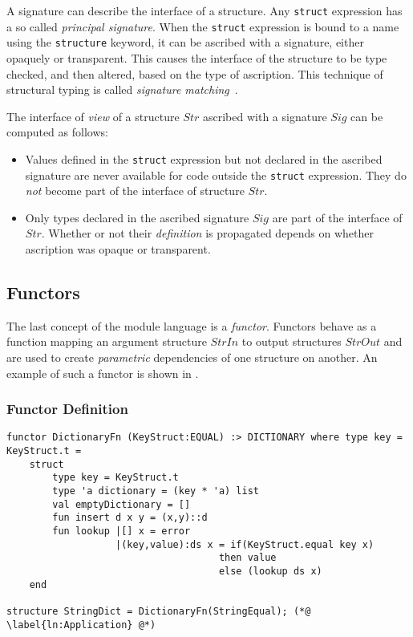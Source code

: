 \documentclass[11pt]{article}
\newcommand{\cmath}[1]{\ensuremath{\mathit{#1}}}
\begin{document}
A signature can describe the interface of a structure.
Any \lstinline{struct} expression has a so called \emph{principal signature}.
When the \lstinline{struct} expression is bound to a name using the \lstinline{structure} keyword, it can be ascribed with a signature, either opaquely or transparent.
This causes the interface of the structure to be type checked, and then altered, based on the type of ascription.
This technique of structural typing is called \emph{signature matching}~\cite{Pierce:Adv}.

The interface of \emph{view} of a structure \cmath{Str} ascribed with a signature \cmath{Sig} can be computed as follows:
\begin{itemize}
\item Values defined in the \lstinline{struct} expression but not declared in the ascribed signature are never available for code outside the \lstinline{struct} expression.
They do \emph{not} become part of the interface of structure \cmath{Str}.
\item
Only types declared in the ascribed signature \cmath{Sig} are part of the interface of \cmath{Str}.
Whether or not their \emph{definition} is propagated depends on whether ascription was opaque or transparent.
\end{itemize}

\subsection{Functors}
The last concept of the module language is a \emph{functor}.
Functors behave as a function mapping an argument structure \cmath{StrIn} to output structures \cmath{StrOut} and are used to create \emph{parametric} dependencies of one structure on another.
An example of such a functor is shown in .

\subsubsection{Functor Definition}
\begin{lstlisting}[label={lst:DictionaryFunctorExample}, caption={The Dictionary as a functor. The structures and signatures that this example depends on are shown in {\protect\myref{lst}{lst:AdditionalSignatures}} in Appendix {\protect\ref{app:AdditionalCode}}.}]
functor DictionaryFn (KeyStruct:EQUAL) :> DICTIONARY where type key = KeyStruct.t =
    struct
        type key = KeyStruct.t
        type 'a dictionary = (key * 'a) list
        val emptyDictionary = []
        fun insert d x y = (x,y)::d
        fun lookup |[] x = error
                   |(key,value):ds x = if(KeyStruct.equal key x)
                                     then value
                                     else (lookup ds x)
    end
    
structure StringDict = DictionaryFn(StringEqual); (*@ \label{ln:Application} @*)
\end{lstlisting}
\end{document}
